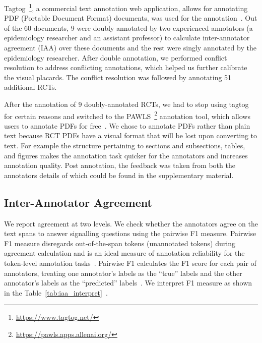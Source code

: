 \documentclass[sn-mathphys,Numbered]{sn-jnl}%
\theoremstyle{thmstyleone}%
\theoremstyle{thmstyletwo}%
\theoremstyle{thmstylethree}%
\begin{document}
Tagtog~\footnote{\url{https://www.tagtog.net/}}, a commercial text annotation web application, allows for annotating PDF (Portable Document Format) documents, was used for the annotation~\cite{cejuela2014tagtog}.
Out of the 60 documents, 9 were doubly annotated by two experienced annotators (a epidemiology researcher and an assistant professor) to calculate inter-annotator agreement (IAA) over these documents and the rest were singly annotated by the epidemiology researcher.
After double annotation, we performed conflict resolution to address conflicting annotations, which helped us further calibrate the visual placards.
The conflict resolution was followed by annotating 51 additional RCTs.


After the annotation of 9 doubly-annotated RCTs, we had to stop using tagtog for certain reasons and switched to the PAWLS~\footnote{\url{https://pawls.apps.allenai.org/}} annotation tool, which allows users to annotate PDFs for free~\cite{neumann2021pawls}.
We chose to annotate PDFs rather than plain text because RCT PDFs have a visual format that will be lost upon converting to text. 
For example the structure pertaining to sections and subsections, tables, and figures makes the annotation task quicker for the annotators and increases annotation quality.
Post annotation, the feedback was taken from both the annotators details of which could be found in the supplementary material. %
%
%
%
\subsection{Inter-Annotator Agreement}
\label{subsec:corpus}
%
We report agreement at two levels. 
We check whether the annotators agree on the text spans to answer signalling questions using the pairwise F1 measure.
Pairwise F1 measure disregards out-of-the-span tokens (unannotated tokens) during agreement calculation and is an ideal measure of annotation reliability for the token-level annotation tasks~\cite{deleger2012building}.
Pairwise F1 calculates the F1 score for each pair of annotators, treating one annotator's labels as the ``true'' labels and the other annotator's labels as the ``predicted'' labels~\cite{brandsen2020creating}.
We interpret F1 measure as shown in the Table~\ref{tab:iaa_interpret}~\cite{landis1977measurement}.
\end{document}
